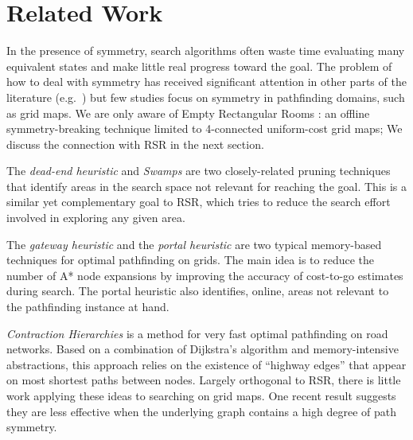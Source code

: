 \section{Related Work}
\label{sec:relatedwork}
In the presence of symmetry, search algorithms often waste time evaluating many
equivalent states and make little real progress toward the goal.  The problem of
how to deal with symmetry has received significant attention in other parts of
the literature (e.g.~\cite{rossi06}) but few studies focus on symmetry in
pathfinding domains, such as grid maps.  We are only aware of Empty Rectangular
Rooms \cite{harabor10}: an offline symmetry-breaking technique limited to
4-connected uniform-cost grid maps; We discuss the connection with RSR in the
next section.
\par
The \emph{dead-end heuristic} \cite{bjornsson06} and \emph{Swamps} \cite{pochter10} 
are two closely-related pruning techniques
that identify areas in the search space not relevant for reaching the goal. 
This is a similar yet complementary goal
to RSR, which tries to reduce the search effort involved in exploring any given
area. 
\par
The \emph{gateway heuristic} \cite{bjornsson06} and the \emph{portal heuristic}
\cite{goldenberg10} are two typical memory-based techniques for optimal 
pathfinding on grids. 
The main idea is to reduce the number of
A* node expansions by improving the accuracy of cost-to-go estimates during
search.  The portal heuristic also identifies, online, areas
not relevant to the pathfinding instance at hand.
\par
\emph{Contraction Hierarchies} \cite{geisberger08} is a method for
very fast optimal pathfinding on road networks. 
Based on a combination of Dijkstra's algorithm and memory-intensive
abstractions, this approach relies on the existence of ``highway edges'' that appear
on most shortest paths between nodes.
Largely orthogonal to RSR, there is little work applying these ideas to searching on grid maps.
One recent result \cite{sturtevant10} suggests they are less effective when the 
underlying graph contains a high degree of path
symmetry.
